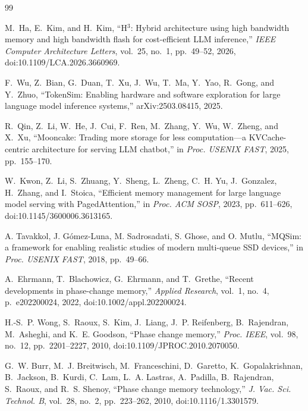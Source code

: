 \documentclass[11pt,a4paper]{article}
\begin{document}
\begin{thebibliography}{99}

M.~Ha, E.~Kim, and H.~Kim,
``H$^{3}$: Hybrid architecture using high bandwidth memory and high bandwidth
flash for cost-efficient LLM inference,''
\emph{IEEE Computer Architecture Letters}, vol.~25, no.~1, pp.~49--52, 2026,
doi:10.1109/LCA.2026.3660969.

F.~Wu, Z.~Bian, G.~Duan, T.~Xu, J.~Wu, T.~Ma, Y.~Yao, R.~Gong, and Y.~Zhuo,
``TokenSim: Enabling hardware and software exploration for large language
model inference systems,'' arXiv:2503.08415, 2025.

R.~Qin, Z.~Li, W.~He, J.~Cui, F.~Ren, M.~Zhang, Y.~Wu, W.~Zheng, and X.~Xu,
``Mooncake: Trading more storage for less computation---a KVCache-centric
architecture for serving LLM chatbot,''
in \emph{Proc. USENIX FAST}, 2025, pp.~155--170.

W.~Kwon, Z.~Li, S.~Zhuang, Y.~Sheng, L.~Zheng, C.~H. Yu, J.~Gonzalez, H.~Zhang,
and I.~Stoica,
``Efficient memory management for large language model serving with
PagedAttention,''
in \emph{Proc. ACM SOSP}, 2023, pp.~611--626,
doi:10.1145/3600006.3613165.

A. Tavakkol, J. G\'{o}mez-Luna, M. Sadrosadati, S. Ghose, and O. Mutlu,
``MQSim: a framework for enabling realistic studies of modern multi-queue SSD
devices,''
in \emph{Proc. USENIX FAST}, 2018, pp.~49--66.

A.~Ehrmann, T.~Blachowicz, G.~Ehrmann, and T.~Grethe,
``Recent developments in phase-change memory,''
\emph{Applied Research}, vol.~1, no.~4, p.~e202200024, 2022,
doi:10.1002/appl.202200024.

H.-S.~P. Wong, S.~Raoux, S.~Kim, J.~Liang, J.~P. Reifenberg, B.~Rajendran,
M.~Asheghi, and K.~E. Goodson,
``Phase change memory,''
\emph{Proc. IEEE}, vol.~98, no.~12, pp.~2201--2227, 2010,
doi:10.1109/JPROC.2010.2070050.

G.~W. Burr, M.~J. Breitwisch, M.~Franceschini, D.~Garetto,
K.~Gopalakrishnan, B.~Jackson, B.~Kurdi, C.~Lam, L.~A. Lastras, A.~Padilla,
B.~Rajendran, S.~Raoux, and R.~S. Shenoy,
``Phase change memory technology,''
\emph{J. Vac. Sci. Technol. B}, vol.~28, no.~2, pp.~223--262, 2010,
doi:10.1116/1.3301579.


\end{thebibliography}
\end{document}
